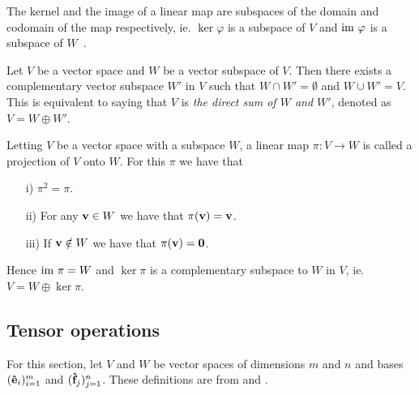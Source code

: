 	\begin{remark}
		The kernel and the image of a linear map are subspaces of the domain and codomain of the map respectively, ie. $\ker \varphi$ is a subspace of $V$ and $\text{im } \varphi$ is a subspace of $W$~\cite[Sect.5.4.]{Holst}.
	\end{remark}	
	
	\begin{theorem}\label{thm:compsubspaces}\cite[Thm.12.16]{Holst}
		Let $V$ be a vector space and $W$ be a vector subspace of $V$. Then there exists a complementary vector subspace $W'$ in $V$ such that $W \cap W' = \emptyset$ and $W \cup W' = V$. This is equivalent to saying that $V$ is \textit{the direct sum of $W$ and $W'$}, denoted as $V = W \oplus W'$.
	\end{theorem}
	
\begin{example}
		Letting $V$ be a vector space with a subspace $W$, a linear map $\pi: V \rightarrow W$ is called a projection of $V$ onto $W$. For this $\pi$ we have that
	\begin{enumerate}
		\item[i)]  $\pi^2 = \pi$.
		\item[ii)] For any $\mathbf{v} \in W$ we have that $\pi(\mathbf{v}) = \mathbf{v}$.
		\item[iii)] If $\mathbf{v} \notin W$ we have that $\pi(\mathbf{v}) = \mathbf{0}$. 
	\end{enumerate}
	Hence $\text{im } \pi = W$ and $\ker \pi$ is a complementary subspace to $W$ in $V$, ie. $V  = W \oplus \ker \pi$.
\end{example}
		
\subsection{Tensor operations}\label{sect:tensoralgebra}

For this section, let $V$ and $W$ be vector spaces of dimensions $m$ and $n$ and bases $(\mathbf{\hat{e}}_i)_{i=1}^m$ and $(\mathbf{\hat{f}}_j)_{j=1}^n$. These definitions are from \cite{Jeevanjee} and \cite{Yokonuma}.
	

